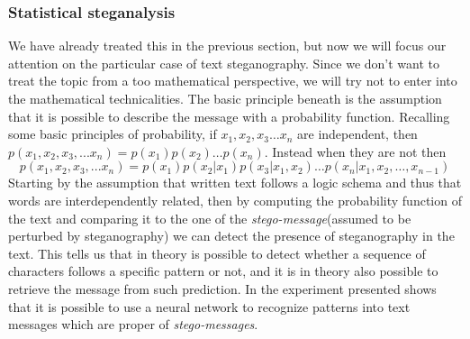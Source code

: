 \documentclass[../../main.tex]{subfiles}
\begin{document}
\subsubsection{Statistical steganalysis}
We have already treated this in the previous section, but now we will focus
our attention on the particular case of text steganography.
Since we don't want to treat the topic from a too mathematical perspective,
we will try not to enter into the mathematical technicalities.
The basic principle beneath is the assumption that it is possible to
describe the message with a probability function.
Recalling some basic principles of probability, if
$ x_1, x_2, x_3 \dots x_n $ are independent, then
$ p(x_1, x_2, x_3, ... x_n) = p(x_1) p(x_2) \dots p(x_n)$. 
Instead when they are not then
$$ p(x_1, x_2, x_3, ... x_n) = p(x_1) p(x_2 | x_1) p(x_3 | x_1, x_2) \dots
p(x_n | x_1, x_2, \dots, x_{n-1}) $$
Starting by the assumption that written text follows a logic schema and thus
that words are interdependently related, then by computing the probability
function of the text and comparing it to the one of the
\emph{stego-message}(assumed to be perturbed by steganography) we can detect
the presence of steganography in the text. 
This tells us that in theory is possible to detect whether a sequence of
characters follows a specific pattern or not, and it is in theory also
possible to retrieve the message from such prediction.
In \cite{fast-steg-method} the experiment presented shows that it is
possible to use a neural network to recognize patterns into text messages
which are proper of \emph{stego-messages}.
\end{document}
